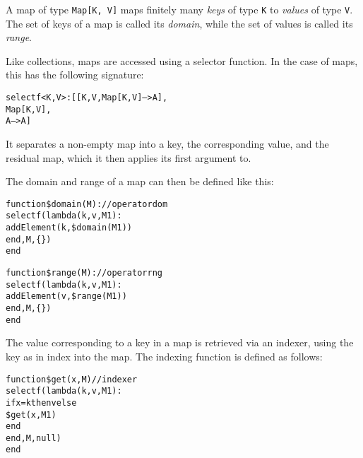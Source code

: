 

A map of type {\tt Map[K, V]} maps finitely many {\em keys} of type {\tt K} to {\em values} of
type {\tt V}. The set of keys of a map is called its {\em domain},
while the set of values is called its {\em range}. 


Like collections, maps are accessed using a selector
function. In the case of maps, this has the following signature:
\begin{alltt}selectf<K, V>: [[K, V, Map[K, V] --> A],
                Map[K, V],
                A --> A]\end{alltt}

It separates a non-empty map into a key, the corresponding value, and
the residual map, which it then applies its first argument to.


The domain and range of a map can then be defined like this:
\begin{alltt}function \$domain(M) : // operator dom
    selectf(lambda (k, v, M1) :
                addElement(k, \$domain(M1))
            end, M, \{\})
end

function \$range(M) : // operator rng
    selectf(lambda (k, v, M1) :
                addElement(v, \$range(M1))
            end, M, \{\})
end
\end{alltt}




The value corresponding to a key in a map is retrieved via an indexer,
using the key as in index into the map. The indexing function is
defined as follows:
\begin{alltt}function \$get(x, M) // indexer
    selectf(lambda(k, v, M1) :
                if x = k then v else
                    \$get(x, M1)
                end
            end, M, null)
end\end{alltt}



